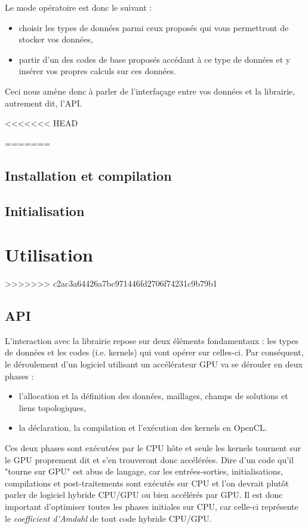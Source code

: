 \documentclass[a4paper,12pt]{article}
\begin{document}
Le mode opératoire est donc le suivant :

\begin{itemize}
\item choisir les types de données parmi ceux proposés qui vous permettront de stocker vos données,
\item partir d'un des codes de base proposés accédant à ce type de données et y insérer vos propres calculs sur ces données.
\end{itemize}

Ceci nous amène donc à parler de l'interfaçage entre vos données et la librairie, autrement dit, l'API.

<<<<<<< HEAD

=======
\subsection{Installation et compilation}

\subsection{Initialisation}


%
%

\section{Utilisation}

>>>>>>> c2ac3a64426a7bc971446fd2706f74231c9b79b1
\subsection{API}
\label{sec:API}
L'interaction avec la librairie repose sur deux éléments fondamentaux : les types de données et les codes (i.e. kernels) qui vont opérer sur celles-ci. Par conséquent, le déroulement d'un logiciel utilisant un accélérateur GPU va se dérouler en deux phases :

\begin{itemize}
\item l'allocation et la définition des données, maillages, champs de solutions et liens topologiques,
\item la déclaration, la compilation et l'exécution des kernels en OpenCL.
\end{itemize}

Ces deux phases sont exécutées par le CPU hôte et seule les kernels tournent sur le GPU proprement dit et s'en trouveront donc accélérées. Dire d'un code qu'il "tourne sur GPU" est abus de langage, car les entrées-sorties, initialisations, compilations et post-traitements sont exécutés sur CPU et l'on devrait plutôt parler de logiciel hybride CPU/GPU ou bien accélérés par GPU. Il est donc important d'optimiser toutes les phases initiales sur CPU, car celle-ci représente le \emph{coefficient d'Amdahl} de tout code hybride CPU/GPU.
\end{document}
